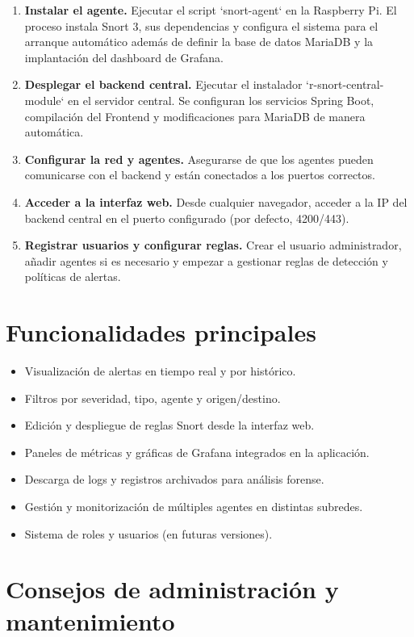 \documentclass[11pt,a4paper,twoside]{report}
\begin{document}
\begin{enumerate}
	\item \textbf{Instalar el agente.} Ejecutar el script `snort-agent` en la Raspberry Pi. El proceso instala Snort 3, sus dependencias y configura el sistema para el arranque automático además de definir la base de datos MariaDB y la implantación del dashboard de Grafana.
	\item \textbf{Desplegar el backend central.} Ejecutar el instalador `r-snort-central-module` en el servidor central. Se configuran los servicios Spring Boot, compilación del Frontend y modificaciones para MariaDB de manera automática.
	\item \textbf{Configurar la red y agentes.} Asegurarse de que los agentes pueden comunicarse con el backend y están conectados a los puertos correctos.
	\item \textbf{Acceder a la interfaz web.} Desde cualquier navegador, acceder a la IP del backend central en el puerto configurado (por defecto, 4200/443).
	\item \textbf{Registrar usuarios y configurar reglas.} Crear el usuario administrador, añadir agentes si es necesario y empezar a gestionar reglas de detección y políticas de alertas.
\end{enumerate}

\section{Funcionalidades principales}

\begin{itemize}
	\item Visualización de alertas en tiempo real y por histórico.
	\item Filtros por severidad, tipo, agente y origen/destino.
	\item Edición y despliegue de reglas Snort desde la interfaz web.
	\item Paneles de métricas y gráficas de Grafana integrados en la aplicación.
	\item Descarga de logs y registros archivados para análisis forense.
	\item Gestión y monitorización de múltiples agentes en distintas subredes.
	\item Sistema de roles y usuarios (en futuras versiones).
\end{itemize}

\section{Consejos de administración y mantenimiento}
\end{document}
